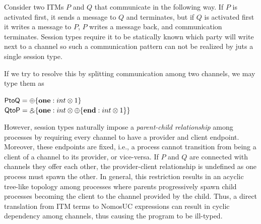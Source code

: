 Consider two ITMs $P$ and $Q$ that communicate in the following way. If $P$ is activated first,
it sends a message to $Q$ and terminates, but if $Q$ is activated first it writes a message to $P$, 
$P$ writes a message back, and communication terminates.
Session types require it to be statically known which party will write next to a channel so such
a communication pattern can not be realized by juts a single session type.

If we try to resolve this by splitting communication among two channels, we may type them as
\vspace{2mm}

{\centering
 $\mathsf{PtoQ} = \oplus \{ \mathbf{one}: int \otimes 1 \}$ \\
 $\mathsf{QtoP} = \mathbin{\binampersand} \{ \mathbf{one}: int \otimes \oplus \{ \mathbf{end}: int \otimes 1 \} \}$
\par}
\vspace{2mm}
However, session types naturally impose a \emph{parent-child relationship} among processes by requiring
every channel to have a provider and client endpoint.
Moreover, these endpoints are fixed, i.e., a process cannot transition from being a client of
a channel to its provider, or vice-versa.
If $P$ and $Q$ are connected with channels they offer each other, the provider-client relationship
is undefined as one process must spawn the other.
In general, this restriction results in an acyclic tree-like topology among processes where parents progressively
spawn child processes becoming the client to the channel provided by the child.
Thus, a direct translation from ITM terms to NomosUC expressions can result in cyclic
dependency among channels, thus causing the program to be ill-typed.

